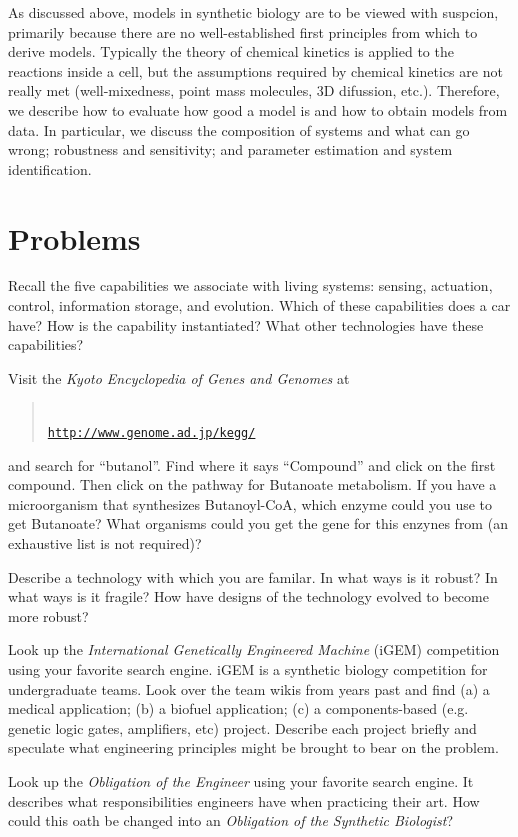 As discussed above, models in synthetic biology are to be viewed with
suspcion, primarily because there are no well-established first
principles from which to derive models. Typically the theory of
chemical kinetics is applied to the reactions inside a cell, but the
assumptions required by chemical kinetics are not really met
(well-mixedness, point mass molecules, 3D difussion, etc.). Therefore,
we describe how to evaluate how good a model is and how to obtain
models from data. In particular, we discuss the composition of systems
and what can go wrong; robustness and sensitivity; and parameter
estimation and system identification.

\section{Problems}

\begin{exercise}
  Recall the five capabilities we associate with living systems:
  sensing, actuation, control, information storage, and
  evolution. Which of these capabilities does a car have? How is the
  capability instantiated? What other technologies have these
  capabilities?
\end{exercise}

\begin{exercise}
  Visit the {\em Kyoto Encyclopedia of Genes and Genomes} at
\begin{quote}
  \ \\
  \href{http://www.genome.ad.jp/kegg/}{\tt http://www.genome.ad.jp/kegg/}
  \ \\
\end{quote}
  and search for ``butanol''. Find where
  it says ``Compound'' and click on the first compound. Then click on
  the pathway for Butanoate metabolism. If you have a microorganism
  that synthesizes Butanoyl-CoA, which enzyme could you use to
  get Butanoate? What organisms could you get the gene for this
  enzynes from (an exhaustive list is not required)?
\end{exercise}

\begin{exercise}
  Describe a technology with which you are familar. In what ways is it
  robust? In what ways is it fragile? How have designs of the
  technology evolved to become more robust? 
\end{exercise}

\begin{exercise}
  Look up the {\em International Genetically Engineered Machine}
  (iGEM) competition using your favorite search engine. iGEM is a
  synthetic biology competition for undergraduate teams. Look over the
  team wikis from years past and find (a) a medical application; (b) a
  biofuel application; (c) a components-based (e.g. genetic logic
  gates, amplifiers, etc) project. Describe each project briefly and
  speculate what engineering principles might be brought to bear on
  the problem.
\end{exercise}

\begin{exercise}
  Look up the {\em Obligation of the Engineer} using your favorite
  search engine. It describes what responsibilities engineers have
  when practicing their art. How could this oath be changed into an
  {\em Obligation of the Synthetic Biologist}?
\end{exercise}
